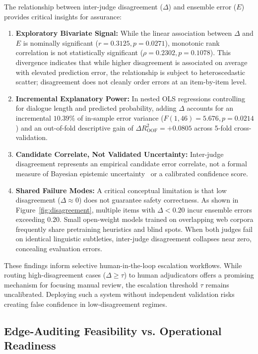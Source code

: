 The relationship between inter-judge disagreement ($\Delta$) and ensemble error ($E$) provides critical insights for assurance:
\begin{enumerate}
    \item \textbf{Exploratory Bivariate Signal:} While the linear association between $\Delta$ and $E$ is nominally significant ($r=0.3125, p=0.0271$), monotonic rank correlation is not statistically significant ($\rho=0.2302, p=0.1078$). This divergence indicates that while higher disagreement is associated on average with elevated prediction error, the relationship is subject to heteroscedastic scatter; disagreement does not cleanly order errors at an item-by-item level.
    \item \textbf{Incremental Explanatory Power:} In nested OLS regressions controlling for dialogue length and predicted probability, adding $\Delta$ accounts for an incremental $10.39\%$ of in-sample error variance ($F(1, 46)=5.676, p=0.0214$) and an out-of-fold descriptive gain of $\Delta R^2_{\text{OOF}}=+0.0805$ across 5-fold cross-validation.
    \item \textbf{Candidate Correlate, Not Validated Uncertainty:} Inter-judge disagreement represents an empirical candidate error correlate, not a formal measure of Bayesian epistemic uncertainty~\cite{malinin2018predictive,kuhn2023semantic} or a calibrated confidence score.
    \item \textbf{Shared Failure Modes:} A critical conceptual limitation is that low disagreement ($\Delta \approx 0$) does not guarantee safety correctness. As shown in Figure~\ref{fig:disagreement}, multiple items with $\Delta < 0.20$ incur ensemble errors exceeding $0.20$. Small open-weight models trained on overlapping web corpora frequently share pretraining heuristics and blind spots. When both judges fail on identical linguistic subtleties, inter-judge disagreement collapses near zero, concealing evaluation errors.
\end{enumerate}

These findings inform selective human-in-the-loop escalation workflows. While routing high-disagreement cases ($\Delta \ge \tau$) to human adjudicators offers a promising mechanism for focusing manual review, the escalation threshold $\tau$ remains uncalibrated. Deploying such a system without independent validation risks creating false confidence in low-disagreement regimes.

\subsection{Edge-Auditing Feasibility vs. Operational Readiness}
\label{subsec:disc_practical_implications}

